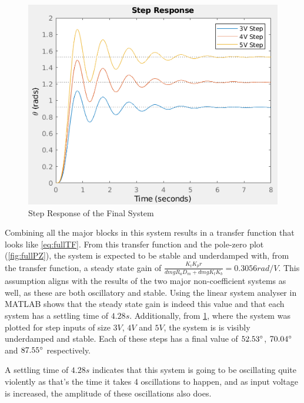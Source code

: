 \documentclass[a4paper, 11pt, compsoc]{IEEEtran}
\begin{document}
            \begin{figure}
                \centering
                \includegraphics[width=\columnwidth]{fullSystemResponse.png}
                \caption{Step Response of the Final System}
                \label{fig:fullStepResponse}
            \end{figure}

            Combining all the major blocks in this system results in a transfer function that looks like \cref{eq:fullTF}. From this transfer function and the pole-zero plot (\cref{fig:fullPZ}), the system is expected to be stable and underdamped with, from the transfer function, a steady state gain of $\frac{K_tK_pr}{dmgR_aD_m + dmgK_tK_b} = 0.3056 rad/V$. This assumption aligns with the results of the two major non-coefficient systems as well, as these are both oscillatory and stable. Using the linear system analyser in MATLAB shows that the steady state gain is indeed this value and that each system has a settling time of $4.28s$. Additionally, from \cref{fig:fullStepResponse}, where the system was plotted for step inputs of size $3V$, $4V$ and $5V$, the system is is visibly underdamped and stable. Each of these steps has a final value of $52.53 \degree$, $70.04 \degree$ and $87.55 \degree$ respectively.
            \par
            A settling time of $4.28s$ indicates that this system is going to be oscillating quite violently as that's the time it takes 4 oscillations to happen, and as input voltage is increased, the amplitude of these oscillations also does. 
\end{document}

